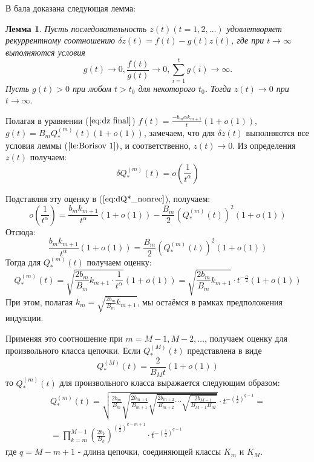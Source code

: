 \documentclass[12pt]{article}
\newtheorem{lemma}{Лемма}
\begin{document}
В \cite{lit:borisov_2gr} бала доказана следующая лемма:
\begin{lemma}
\label{le:Borisov 1}
Пусть последовательность $z(t) (t = 1,2, \ldots)$ удовлетворяет рекуррентному соотношению $\delta z(t) = f(t) - g(t)z(t)$, где при $t \rightarrow \infty$ вы\-пол\-ня\-ют\-ся условия
\begin{equation}
	g(t) \rightarrow 0, \frac{f(t)}{g(t)} \rightarrow 0, \sum_{i=1}^t g(i) \rightarrow \infty \text{.}
\end{equation}
Пусть $g(t) > 0$ при любом $t > t_0$ для некоторого $t_0$. Тогда $z(t) \rightarrow 0$ при $t \rightarrow \infty$.
\end{lemma}

Полагая в уравнении ($\ref{eq:dz final}$) $f(t) = \frac{-b_m \alpha k_{m+1}}{t}(1+o(1))$, $g(t) = B_m Q^{(m)}_*(t)(1+o(1))$, замечаем, что для $\delta z(t)$ выполняются все условия леммы ($\ref{le:Borisov 1})$, и со\-от\-вет\-ствен\-но, $z(t) \rightarrow 0$. Из определения $z(t)$ получаем:
\begin{equation}
	\delta Q^{(m)}_*(t) = o\left( \frac{1}{t^\alpha} \right)
\end{equation}	

Подставляя эту оценку в ($\ref{eq:dQ*_nonrec}$), получаем:
\begin{equation}
	o\left( \frac{1}{t^\alpha} \right) = \frac{b_m k_{m+1}}{t^\alpha}(1+o(1)) - \frac{B_m}{2}\left(Q^{(m)}_*(t)\right)^2(1+o(1))
\end{equation}
Отсюда:
\begin{equation}
	\frac{b_m k_{m+1}}{t^\alpha}(1+o(1)) = \frac{B_m}{2}\left(Q^{(m)}_*(t)\right)^2(1+o(1))
\end{equation}
Тогда для $Q^{(m)}_*(t)$ получаем оценку:
\begin{equation}
	Q^{(m)}_*(t) = \sqrt{ \frac{2b_m}{B_m}k_{m+1} \cdot \frac{1}{t^\alpha} } (1+o(1)) = \sqrt{ \frac{2b_m}{B_m}k_{m+1} } \cdot t^{-\frac{\alpha}{2}}(1+o(1)) \nonumber
\end{equation}
При этом, полагая $k_m = \sqrt{ \frac{2b_m}{B_m}k_{m+1} }$, мы остаёмся в рамках предположения индукции.

Применяя это соотношение при $m = M-1,M-2,\ldots$, получаем оценку для произвольного класса цепочки. Если $Q^{(M)}_*(t)$ представлена в виде
\begin{equation*}
	Q^{(M)}_*(t) = \frac{2}{B_M t}(1+o(1))
\end{equation*}
то $Q^{(m)}_*(t)$ для произвольного класса выражается следующим образом:
\begin{multline}
	Q^{(m)}_*(t) = \sqrt{\frac{2b_m}{B_m} \sqrt{\frac{2b_{m+1}}{B_{m+1}} \sqrt{\frac{2b_{m+2}}{B_{m+2}} \cdots \sqrt{\frac{2b_{M-1}}{B_{M-1}B_M}}}}} \cdot t^{-(\frac{1}{2})^{q-1}} = \\
	= \prod_{k=m}^{M-1} \left(\frac{2b_k}{B_k}\right)^{(\frac{1}{2})^{k-m+1}} \cdot t^{-(\frac{1}{2})^{q-1}}
\end{multline}
где $q = M - m + 1$ - длина цепочки, соединяющей классы $K_m$ и $K_M$.
\end{document}
